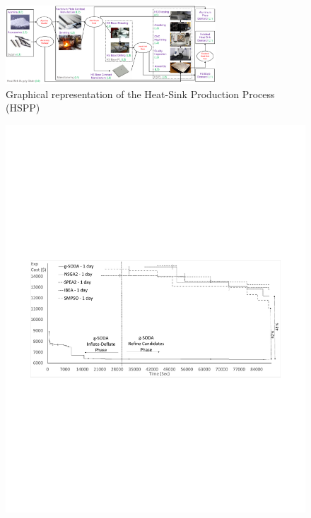 \documentclass[a4paper, 12pt]{article} %
\begin{document}
\begin{figure}[h!]
	\begin{center}
		\includegraphics[width=0.7\textwidth]{images/HeatSink_contractSN.pdf}
		\caption{Graphical representation of the Heat-Sink Production Process (HSPP)}
		\label{fig:heatsinkSC}       %
	\end{center}
\end{figure}

\begin{figure}[h!]
	\begin{minipage}{.5\textwidth}
		\begin{center}
			\includegraphics[width=\textwidth]{images/sodavsjmetal1day.pdf}

\end{center}
\end{minipage}
\end{figure}
\end{document}
